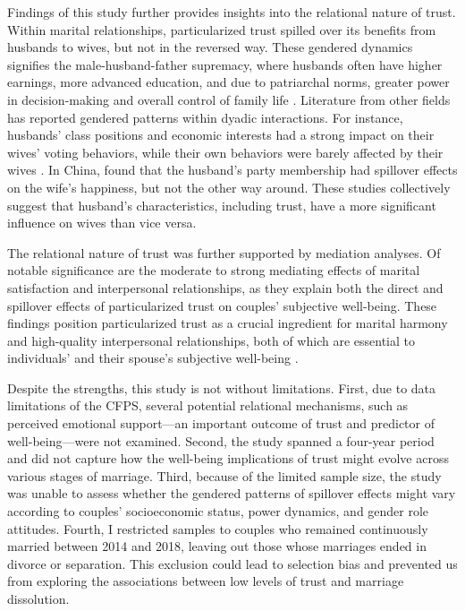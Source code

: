 Findings of this study further provides insights into the relational nature of trust. Within marital relationships, particularized trust spilled over its benefits from husbands to wives, but not in the reversed way. These gendered dynamics signifies the male-husband-father supremacy, where husbands often have higher earnings, more advanced education, and due to patriarchal norms, greater power in decision-making and overall control of family life \parencite{jiUnequalCareUnequal2017}. Literature from other fields has reported gendered patterns within dyadic interactions. For instance, husbands' class positions and economic interests had a strong impact on their wives' voting behaviors, while their own behaviors were barely affected by their wives \parencite{dirkdegraafHusbandsWivesVoting1992}. In China, \textcite{wangDoesHappinessContemporary2019} found that the husband's party membership had spillover effects on the wife's happiness, but not the other way around. These studies collectively suggest that husband's characteristics, including trust, have a more significant influence on wives than vice versa.

The relational nature of trust was further supported by mediation analyses. Of notable significance are the moderate to strong mediating effects of marital satisfaction and interpersonal relationships, as they explain both the direct and spillover effects of particularized trust on couples' subjective well-being. These findings position particularized trust as a crucial ingredient for marital harmony and high-quality interpersonal relationships, both of which are essential to individuals' and their spouse's subjective well-being \parencite{fitzpatrickAttachmentTrustSatisfaction2017,rusbultCommitmentTrustClose1999}.

Despite the strengths, this study is not without limitations. First, due to data limitations of the CFPS, several potential relational mechanisms, such as perceived emotional support—an important outcome of trust and predictor of well-being—were not examined. Second, the study spanned a four-year period and did not capture how the well-being implications of trust might evolve across various stages of marriage. Third, because of the limited sample size, the study was unable to assess whether the gendered patterns of spillover effects might vary according to couples' socioeconomic status, power dynamics, and gender role attitudes. Fourth, I restricted samples to couples who remained continuously married between 2014 and 2018, leaving out those whose marriages ended in divorce or separation. This exclusion could lead to selection bias and prevented us from exploring the associations between low levels of trust and marriage dissolution.


